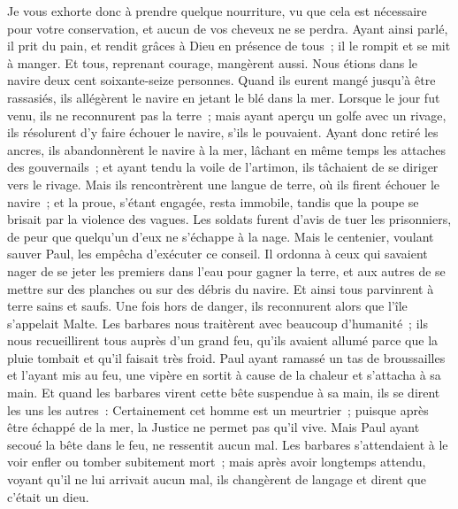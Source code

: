 \begin{multicols}{2}
Je vous exhorte donc à prendre quelque nourriture, vu que cela est nécessaire pour votre conservation, et aucun de vos cheveux ne se perdra.
Ayant ainsi parlé, il prit du pain, et rendit grâces à Dieu en présence de tous~; il le rompit et se mit à manger.
Et tous, reprenant courage, mangèrent aussi.
Nous étions dans le navire deux cent soixante-seize personnes.
Quand ils eurent mangé jusqu'à être rassasiés, ils allégèrent le navire en jetant le blé dans la mer.
Lorsque le jour fut venu, ils ne reconnurent pas la terre~; mais ayant aperçu un golfe avec un rivage, ils résolurent d'y faire échouer le navire, s'ils le pouvaient.
Ayant donc retiré les ancres, ils abandonnèrent le navire à la mer, lâchant en même temps les attaches des gouvernails~; et ayant tendu la voile de l'artimon, ils tâchaient de se diriger vers le rivage.
Mais ils rencontrèrent une langue de terre, où ils firent échouer le navire~; et la proue, s'étant engagée, resta immobile, tandis que la poupe se brisait par la violence des vagues.
Les soldats furent d'avis de tuer les prisonniers, de peur que quelqu'un d'eux ne s'échappe à la nage.
Mais le centenier, voulant sauver Paul, les empêcha d'exécuter ce conseil. Il ordonna à ceux qui savaient nager de se jeter les premiers dans l'eau pour gagner la terre,
et aux autres de se mettre sur des planches ou sur des débris du navire. Et ainsi tous parvinrent à terre sains et saufs.
\VerseOne{}Une fois hors de danger, ils reconnurent alors que l'île s'appelait Malte.
Les barbares nous traitèrent avec beaucoup d'humanité~; ils nous recueillirent tous auprès d'un grand feu, qu'ils avaient allumé parce que la pluie tombait et qu'il faisait très froid.
Paul ayant ramassé un tas de broussailles et l'ayant mis au feu, une vipère en sortit à cause de la chaleur et s'attacha à sa main.
Et quand les barbares virent cette bête suspendue à sa main, ils se dirent les uns les autres~: Certainement cet homme est un meurtrier~; puisque après être échappé de la mer, la Justice ne permet pas qu'il vive. 
Mais Paul ayant secoué la bête dans le feu, ne ressentit aucun mal.
Les barbares s'attendaient à le voir enfler ou tomber subitement mort~; mais après avoir longtemps attendu, voyant qu'il ne lui arrivait aucun mal, ils changèrent de langage et dirent que c'était un dieu.

\end{multicols}
